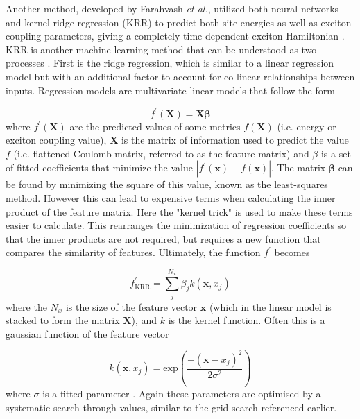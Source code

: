 Another method, developed by Farahvash \emph{et al.}, utilized both neural networks
and kernel ridge regression (KRR) to predict both site energies as well as exciton 
coupling parameters, giving a completely time dependent exciton Hamiltonian \cite{Farahvash2020}. 
KRR is another machine-learning method that can be understood as two processes \cite{Hastie2009}. 
First is the ridge regression, which is similar to a linear regression model but 
with an additional factor to account for co-linear relationships between inputs.
Regression models are multivariate linear models that follow the form

\begin{equation}
	f^\prime\left(\mathbf{X}\right) = \mathbf{X} \mathbf{\beta}
\end{equation}
%
where $f^\prime\left(\mathbf{X}\right)$ are the predicted values of some metrics $f\left(\mathbf{X}\right)$ 
(i.e. \Qy energy or exciton coupling value), $\mathbf{X}$ is the matrix of information
used to predict the value $f$ (i.e. flattened Coulomb matrix, referred to as the feature
matrix) and $\beta$ is a set of fitted coefficients that minimize the value $\left\lvert f^\prime \left( \mathbf{x}\right) - f \left(\mathbf{x}\right)\right\rvert$.
The matrix $\mathbf{\beta}$ can be found by minimizing the square of this value, 
known as the least-squares method. However this can lead to expensive terms when
calculating the inner product of the feature matrix. Here the "kernel trick" is 
used to make these terms easier to calculate. This rearranges the minimization of
regression coefficients so that the inner products are not required, but requires 
a new function that compares the similarity of features. Ultimately, the function 
$f^\prime$ becomes

\begin{equation}
	f_{\text{KRR}}^\prime = \sum^{N_x}_j \beta_j k\left(\mathbf{x}, x_j\right)
\end{equation}
%
where the $N_x$ is the size of the feature vector $\mathbf{x}$ (which in the linear
model is stacked to form the matrix $\mathbf{X}$), and $k$ is the kernel function.
Often this is a gaussian function of the feature vector

\begin{equation}
	k\left(\mathbf{x}, x_j\right) = \text{exp}\left(\frac{-\left(\mathbf{x}-x_j\right)^2}{2\sigma^2}\right)
\end{equation}
%
where $\sigma$ is a fitted parameter \cite{Rasmussen2006}. Again these parameters 
are optimised by a systematic search through values, similar to the grid search
referenced earlier.

